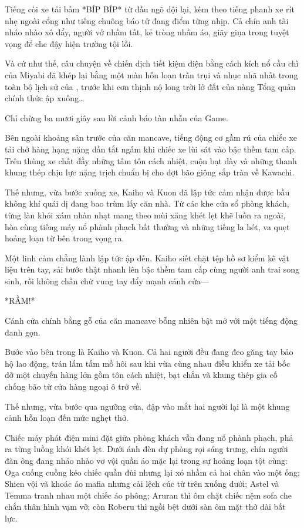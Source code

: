\documentclass[../main.tex]{subfiles}
\begin{document}
Tiếng còi xe tải bấm *BÍP BÍP* từ đầu ngõ dội lại, kèm theo tiếng phanh xe rít nhẹ ngoài cổng như tiếng chuông báo tử đang điểm từng nhịp. Cả chín anh tài nháo nhào xô đẩy, người vớ nhầm tất, kẻ tròng nhầm áo, giãy giụa trong tuyệt vọng để che đậy hiện trường tội lỗi.

Và cứ như thế, câu chuyện về chiến dịch tiết kiệm điện bằng cách kích nổ cầu chì của Miyabi đã khép lại bằng một màn hỗn loạn trần trụi và nhục nhã nhất trong toàn bộ lịch sử của \hls, trước khi cơn thịnh nộ long trời lở đất của nàng Tổng quản chính thức ập xuống\dots

\omk

Chỉ chừng ba mươi giây sau lời cảnh báo tàn nhẫn của Game.

Bên ngoài khoảng sân trước của căn mancave, tiếng động cơ gầm rú của chiếc xe tải chở hàng hạng nặng dần tắt ngấm khi chiếc xe lùi sát vào bậc thềm tam cấp. Trên thùng xe chất đầy những tấm tôn cách nhiệt, cuộn bạt dày và những thanh khung thép chịu lực nặng trịch chuẩn bị cho đợt bão giông sắp tràn về Kawachi.

Thế nhưng, vừa bước xuống xe, Kaiho và Kuon đã lập tức cảm nhận được bầu không khí quái dị đang bao trùm lấy căn nhà. Từ các khe cửa sổ phòng khách, từng làn khói xám nhàn nhạt mang theo mùi xăng khét lẹt khẽ luồn ra ngoài, hòa cùng tiếng máy nổ phành phạch bất thường và những tiếng la hét, va quẹt hoảng loạn từ bên trong vọng ra.

Một linh cảm chẳng lành lập tức ập đến. Kaiho siết chặt tệp hồ sơ kiểm kê vật liệu trên tay, sải bước thật nhanh lên bậc thềm tam cấp cùng người anh trai song sinh, rồi không chần chừ vung tay đẩy mạnh cánh cửa—

*RẦM!*

Cánh cửa chính bằng gỗ của căn mancave bỗng nhiên bật mở với một tiếng động đanh gọn.

Bước vào bên trong là Kaiho và Kuon. Cả hai người đều đang đeo găng tay bảo hộ lao động, trán lấm tấm mồ hôi sau khi vừa cùng nhau điều khiển xe tải bốc dỡ một chuyến hàng lớn gồm tôn cách nhiệt, bạt chắn và khung thép gia cố chống bão từ cửa hàng ngoại ô trở về.

Thế nhưng, vừa bước qua ngưỡng cửa, đập vào mắt hai người lại là một khung cảnh hỗn loạn đến mức nghẹt thở.

Chiếc máy phát điện mini đặt giữa phòng khách vẫn đang nổ phành phạch, phả ra từng luồng khói khét lẹt. Dưới ánh đèn dự phòng rọi sáng trưng, chín người đàn ông đang nháo nhào vơ vội quần áo mặc lại trong sự hoảng loạn tột cùng: Oga cuống cuồng kéo chiếc quần đùi nhưng lại xỏ nhầm cả hai chân vào một ống; Shien vội vã khoác áo mafia nhưng cài lệch cúc từ trên xuống dưới; Astel và Temma tranh nhau một chiếc áo phông; Aruran thì ôm chặt chiếc nệm sofa che chắn thân hình vạm vỡ; còn Roberu thì ngồi bệt dưới sàn ôm mặt thở dài bất lực.
\end{document}
